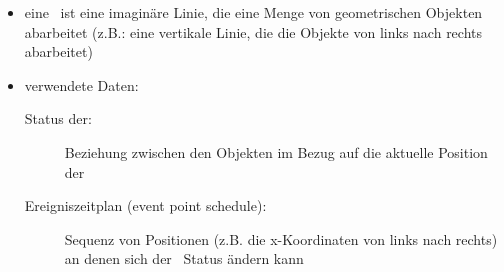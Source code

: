 \vspace*{0.25\baselineskip}
\begin{itemize}
	\item eine \sweep~ist eine imaginäre Linie, die eine Menge von geometrischen Objekten abarbeitet (z.B.: eine vertikale Linie, die die Objekte von links nach rechts abarbeitet)
	\item verwendete Daten:
		\begin{description}
			\item[Status der\sweep:] Beziehung zwischen den Objekten im Bezug auf die aktuelle Position der \sweep
			\item[Ereigniszeitplan (event point schedule):] Sequenz von Positionen (z.B. die x-Koordinaten von links nach rechts) an denen sich der \sweep~Status ändern kann
		\end{description}
\end{itemize}

